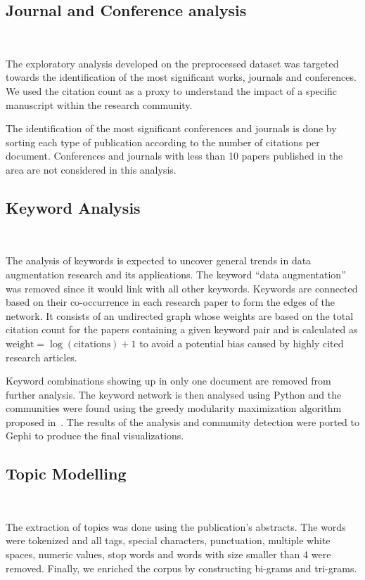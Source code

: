 \documentclass[parskip=full]{scrartcl}
\begin{document}
\subsection{Journal and Conference analysis}~\label{sec:journal_and_conference_analysis}

The exploratory analysis developed on the preprocessed dataset was targeted
towards the identification of the most significant works, journals and
conferences. We used the citation count as a proxy to understand the impact of
a specific manuscript within the research community.

The identification of the most significant conferences and journals is done by
sorting each type of publication according to the number of citations per
document. Conferences and journals with less than 10 papers published in the
area are not considered in this analysis. 

\subsection{Keyword Analysis}~\label{sec:keyword_analysis}

The analysis of keywords is expected to uncover general trends in data
augmentation research and its applications. The keyword ``data augmentation''
was removed since it would link with all other keywords. Keywords are
connected based on their co-occurrence in each research paper to form the
edges of the network.  It consists of an undirected graph whose weights are
based on the total citation count for the papers containing a given keyword
pair and is calculated as $\textrm{weight} = \log(\textrm{citations}) + 1$ to
avoid a potential bias caused by highly cited research articles.

Keyword combinations showing up in only one document are removed from further
analysis. The keyword network is then analysed using Python and the
communities were found using the greedy modularity maximization algorithm
proposed in~\cite{Clauset2004}. The results of the analysis and community
detection were ported to Gephi to produce the final visualizations.

\subsection{Topic Modelling}~\label{sec:topic_modelling}

The extraction of topics was done using the publication's abstracts. The words
were tokenized and all tags, special characters, punctuation, multiple white
spaces, numeric values, stop words and words with size smaller than 4 were
removed. Finally, we enriched the corpus by constructing bi-grams and
tri-grams.
\end{document}
